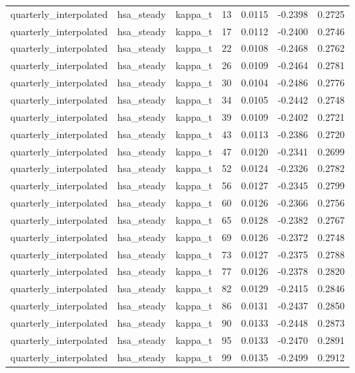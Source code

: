 \begin{tabular}{lllrrrr}
quarterly\_interpolated & hsa\_steady & kappa\_t & 13 & 0.0115 & -0.2398 & 0.2725 \\
quarterly\_interpolated & hsa\_steady & kappa\_t & 17 & 0.0112 & -0.2400 & 0.2746 \\
quarterly\_interpolated & hsa\_steady & kappa\_t & 22 & 0.0108 & -0.2468 & 0.2762 \\
quarterly\_interpolated & hsa\_steady & kappa\_t & 26 & 0.0109 & -0.2464 & 0.2781 \\
quarterly\_interpolated & hsa\_steady & kappa\_t & 30 & 0.0104 & -0.2486 & 0.2776 \\
quarterly\_interpolated & hsa\_steady & kappa\_t & 34 & 0.0105 & -0.2442 & 0.2748 \\
quarterly\_interpolated & hsa\_steady & kappa\_t & 39 & 0.0109 & -0.2402 & 0.2721 \\
quarterly\_interpolated & hsa\_steady & kappa\_t & 43 & 0.0113 & -0.2386 & 0.2720 \\
quarterly\_interpolated & hsa\_steady & kappa\_t & 47 & 0.0120 & -0.2341 & 0.2699 \\
quarterly\_interpolated & hsa\_steady & kappa\_t & 52 & 0.0124 & -0.2326 & 0.2782 \\
quarterly\_interpolated & hsa\_steady & kappa\_t & 56 & 0.0127 & -0.2345 & 0.2799 \\
quarterly\_interpolated & hsa\_steady & kappa\_t & 60 & 0.0126 & -0.2366 & 0.2756 \\
quarterly\_interpolated & hsa\_steady & kappa\_t & 65 & 0.0128 & -0.2382 & 0.2767 \\
quarterly\_interpolated & hsa\_steady & kappa\_t & 69 & 0.0126 & -0.2372 & 0.2748 \\
quarterly\_interpolated & hsa\_steady & kappa\_t & 73 & 0.0127 & -0.2375 & 0.2788 \\
quarterly\_interpolated & hsa\_steady & kappa\_t & 77 & 0.0126 & -0.2378 & 0.2820 \\
quarterly\_interpolated & hsa\_steady & kappa\_t & 82 & 0.0129 & -0.2415 & 0.2846 \\
quarterly\_interpolated & hsa\_steady & kappa\_t & 86 & 0.0131 & -0.2437 & 0.2850 \\
quarterly\_interpolated & hsa\_steady & kappa\_t & 90 & 0.0133 & -0.2448 & 0.2873 \\
quarterly\_interpolated & hsa\_steady & kappa\_t & 95 & 0.0133 & -0.2470 & 0.2891 \\
quarterly\_interpolated & hsa\_steady & kappa\_t & 99 & 0.0135 & -0.2499 & 0.2912 \\
\bottomrule
\end{tabular}
